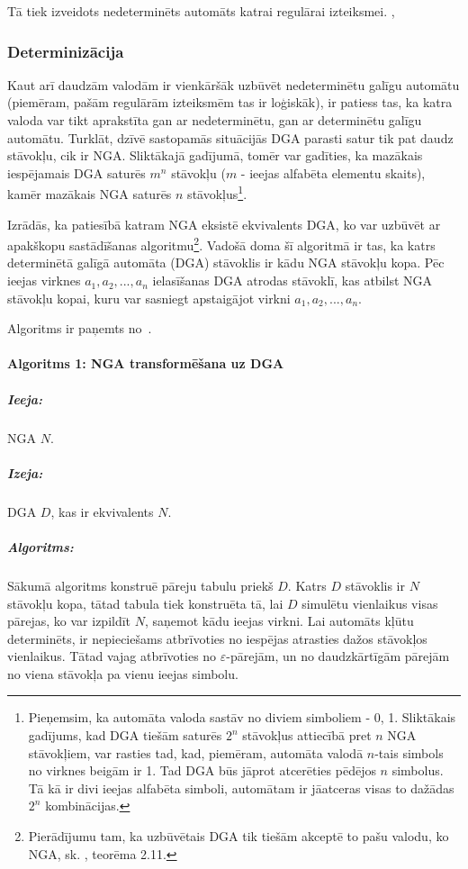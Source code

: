 Tā tiek izveidots nedeterminēts automāts katrai regulārai izteiksmei. \cite{Cox:RegexpMatchingFast}, \cite{DragonBook}

\subsubsection{Determinizācija}

Kaut arī daudzām valodām ir vienkāršāk uzbūvēt nedeterminētu galīgu automātu (piemēram, pašām regulārām izteiksmēm tas ir loģiskāk), ir patiess tas, ka katra valoda var tikt aprakstīta gan ar nedeterminētu, gan ar determinētu galīgu automātu. Turklāt, dzīvē sastopamās situācijās DGA parasti satur tik pat daudz stāvokļu, cik ir NGA. Sliktākajā gadījumā, tomēr var gadīties, ka mazākais iespējamais DGA saturēs $m^n$ stāvokļu ($m$ - ieejas alfabēta elementu skaits), kamēr mazākais NGA saturēs $n$ stāvokļus\footnote{Pieņemsim, ka automāta valoda sastāv no diviem simboliem - {0, 1}. Sliktākais gadījums, kad DGA tiešām saturēs $2^n$ stāvokļus attiecībā pret $n$ NGA stāvokļiem, var rasties tad, kad, piemēram, automāta valodā $n$-tais simbols no virknes beigām ir 1. Tad DGA būs jāprot atcerēties pēdējos $n$ simbolus. Tā kā ir divi ieejas alfabēta simboli, automātam ir jāatceras visas to dažādas $2^n$ kombinācijas.}.

Izrādās, ka patiesībā katram NGA eksistē ekvivalents DGA, ko var uzbūvēt ar apakškopu sastādīšanas algoritmu\footnote{Pierādījumu tam, ka uzbūvētais DGA tik tiešām akceptē to pašu valodu, ko NGA, sk.  \cite{Hopcroft:IntroAutomataTheory}, teorēma 2.11.}. Vadošā doma šī algoritmā ir tas, ka katrs determinētā galīgā automāta (DGA) stāvoklis ir kādu NGA stāvokļu kopa. Pēc ieejas virknes $a_1, a_2, ..., a_n$ ielasīšanas DGA atrodas stāvoklī, kas atbilst NGA stāvokļu kopai, kuru var sasniegt apstaigājot virkni $a_1, a_2, ..., a_n$.

Algoritms ir paņemts no~\cite{DragonBook}.

\paragraph*{Algoritms 1: NGA transformēšana uz DGA}
\subparagraph{Ieeja:}NGA $N$.
\subparagraph{Izeja:}DGA $D$, kas ir ekvivalents $N$.
\subparagraph{Algoritms:} Sākumā algoritms konstruē pāreju tabulu priekš $D$. Katrs $D$ stāvoklis ir $N$ stāvokļu kopa, tātad tabula tiek konstruēta tā, lai $D$ simulētu vienlaikus visas pārejas, ko var izpildīt $N$, saņemot kādu ieejas virkni. Lai automāts kļūtu determinēts, ir nepieciešams atbrīvoties no iespējas atrasties dažos stāvokļos vienlaikus. Tātad vajag atbrīvoties no $\varepsilon$-pārejām, un no daudzkārtīgām pārejām no viena stāvokļa pa vienu ieejas simbolu.

